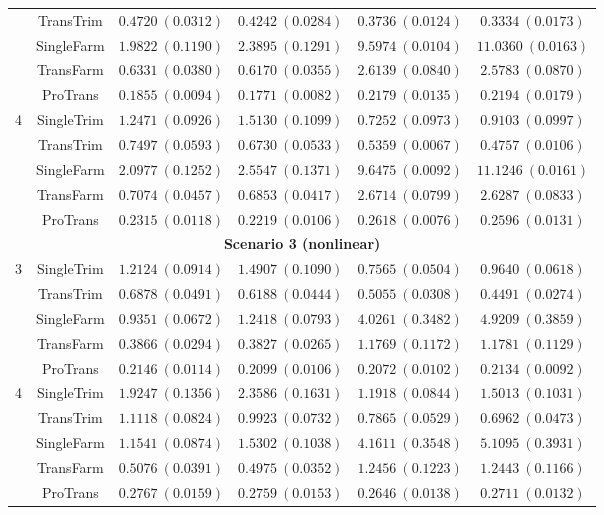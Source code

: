 \documentclass[12pt]{article}
\begin{document}
\begin{table}[!ht]
\begin{tabular}{cccccc}
        & TransTrim   & $0.4720\ (0.0312)$ & $0.4242\ (0.0284)$ & $0.3736\ (0.0124)$ & $0.3334\ (0.0173)$ \\
        & SingleFarm  & $1.9822\ (0.1190)$ & $2.3895\ (0.1291)$ & $9.5974\ (0.0104)$ & $11.0360\ (0.0163)$ \\
        & TransFarm  & $0.6331\ (0.0380)$ & $0.6170\ (0.0355)$ & $2.6139\ (0.0840)$ & $2.5783\ (0.0870)$ \\
        & ProTrans   & $\bm{0.1855}\ (0.0094)$ & $\bm{0.1771}\ (0.0082)$ & $\bm{0.2179}\ (0.0135)$ & $\bm{0.2194}\ (0.0179)$ \\
         \hline
        \multirow{5}{*}{4} 
        & SingleTrim  & $1.2471\ (0.0926)$ & $1.5130\ (0.1099)$ & $0.7252\ (0.0973)$ & $0.9103\ (0.0997)$ \\
        & TransTrim & $0.7497\ (0.0593)$ & $0.6730\ (0.0533)$ & $0.5359\ (0.0067)$ & $0.4757\ (0.0106)$ \\
        & SingleFarm  & $2.0977\ (0.1252)$ & $2.5547\ (0.1371)$ & $9.6475\ (0.0092)$ & $11.1246\ (0.0161)$ \\
        & TransFarm  & $0.7074\ (0.0457)$ & $0.6853\ (0.0417)$ & $2.6714\ (0.0799)$ & $2.6287\ (0.0833)$ \\
        & ProTrans   & $\bm{0.2315}\ (0.0118)$ & $\bm{0.2219}\ (0.0106)$ & $\bm{0.2618}\ (0.0076)$ & $\bm{0.2596}\ (0.0131)$ \\
        \hline
         \multicolumn{6}{c}{\textbf{Scenario 3 (nonlinear)}}\\
        \hline
        \multirow{5}{*}{3} 
        & SingleTrim  & $1.2124\ (0.0914)$ & $1.4907\ (0.1090)$ & $0.7565\ (0.0504)$ & $0.9640\ (0.0618)$ \\
        & TransTrim   & $0.6878\ (0.0491)$ & $0.6188\ (0.0444)$ & $0.5055\ (0.0308)$ & $0.4491\ (0.0274)$ \\
        & SingleFarm  & $0.9351\ (0.0672)$ & $1.2418\ (0.0793)$ & $4.0261\ (0.3482)$ & $4.9209\ (0.3859)$ \\
        & TransFarm   & $0.3866\ (0.0294)$ & $0.3827\ (0.0265)$ & $1.1769\ (0.1172)$ & $1.1781\ (0.1129)$ \\
        & ProTrans   & $\bm{0.2146}\ (0.0114)$  & $\bm{0.2099}\ (0.0106)$ & $\bm{0.2072}\ (0.0102)$ & $\bm{0.2134}\ (0.0092)$ \\
         \hline
        \multirow{5}{*}{4} 
       & SingleTrim & $1.9247\ (0.1356)$ & $2.3586\ (0.1631)$ & $1.1918\ (0.0844)$ & $1.5013\ (0.1031)$ \\
        & TransTrim  & $1.1118\ (0.0824)$ & $0.9923\ (0.0732)$ & $0.7865\ (0.0529)$ & $0.6962\ (0.0473)$ \\
        & SingleFarm & $1.1541\ (0.0874)$ & $1.5302\ (0.1038)$ & $4.1611\ (0.3548)$ & $5.1095\ (0.3931)$ \\
        & TransFarm  & $0.5076\ (0.0391)$  & $0.4975\ (0.0352)$  & $1.2456\ (0.1223)$ & $1.2443\ (0.1166)$ \\
           & ProTrans  & $\bm{0.2767}\ (0.0159)$ & $\bm{0.2759}\ (0.0153)$ & $\bm{0.2646}\ (0.0138)$ &$\bm{0.2711}\ (0.0132)$ \\
        \bottomrule
    \end{tabular}
\end{table}
\end{document}
